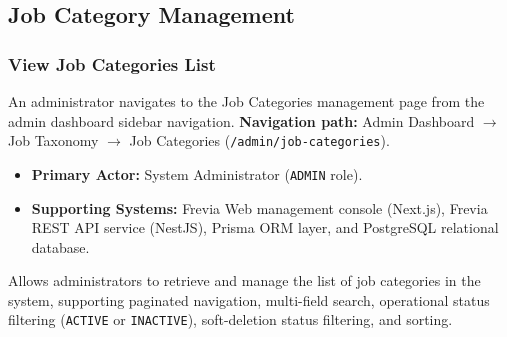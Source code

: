 
\subsection{Job Category Management}

\subsubsection{ View Job Categories List}

An administrator navigates to the Job Categories management page from the admin dashboard sidebar navigation.\newline
\textbf{Navigation path:} Admin Dashboard $\rightarrow$ Job Taxonomy $\rightarrow$ Job Categories (\texttt{/\allowbreak{}admin/\allowbreak{}job-\allowbreak{}categories}).


\begin{itemize}[leftmargin=1.6em,topsep=3pt,itemsep=2pt,parsep=0pt,label=$\bullet$]
    \item \textbf{Primary Actor:} System Administrator (\texttt{ADMIN} role).
    \item \textbf{Supporting Systems:} Frevia Web management console (Next.js), Frevia REST API service (NestJS), Prisma ORM layer, and PostgreSQL relational database.
\end{itemize}

\noindent Allows administrators to retrieve and manage the list of job categories in the system, supporting paginated navigation, multi-field search, operational status filtering (\texttt{ACTIVE} or \texttt{INACTIVE}), soft-deletion status filtering, and sorting.

